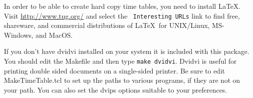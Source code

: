 In order to be able to create hard copy time tables, you need to
install \LaTeX.  Visit \url{http://www.tug.org/} and select the {\tt
Interesting URLs} link to find free, shareware, and commercial
distributions of \LaTeX\ for UNIX/Linux, MS-Windows, and MacOS.

If you don't have dvidvi installed on your system it is included with
this package.  You should edit the Makefile and then type {\tt make dvidvi}.
Dvidvi is useful for printing double sided documents on a single-sided
printer.  Be sure to edit MakeTimeTable.tcl to set up the paths to
various programs, if they are not on your path.  You can also set the
dvips options suitable to your preferences.





